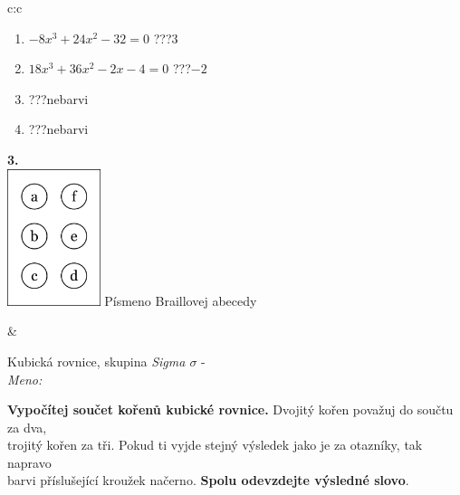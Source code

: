\documentclass[10pt]{report}
\begin{document}
\begin{tabular}{c:c}
\begin{minipage}[c][104.5mm][t]{0.5\linewidth}
\begin{center}
\begin{minipage}{0.79\linewidth}
\begin{center}
\begin{varwidth}{\linewidth}
\begin{enumerate}
\item $-8x^3+24x^2-32=0$\quad \dotfill\; ???\;\dotfill \quad $3$
\item $18x^3+36x^2-2x-4=0$\quad \dotfill\; ???\;\dotfill \quad $-2$
\item \quad \dotfill\; ???\;\dotfill \quad nebarvi
\item \quad \dotfill\; ???\;\dotfill \quad nebarvi
\end{enumerate}
\end{varwidth}
\end{center}
\end{minipage}
\begin{minipage}{0.20\linewidth}
\begin{center}
{\Huge\bfseries 3.} \\[2mm]
\includegraphics[height=40mm]{../images/braille.png}
{\small Písmeno Braillovej abecedy}
\end{center}
\end{minipage}
\end{center}
\end{minipage}
&
\begin{minipage}[c][104.5mm][t]{0.5\linewidth}
\begin{center}
\vspace{7mm}
{\huge Kubická rovnice, skupina \textit{Sigma $\sigma$} -}\\[5mm]
\textit{Meno:}\phantom{xxxxxxxxxxxxxxxxxxxxxxxxxxxxxxxxxxxxxxxxxxxxxxxxxxxxxxxxxxxxxxxxx}\\[5mm]
\begin{minipage}{0.95\linewidth}
\textbf{Vypočítej součet kořenů kubické rovnice.} Dvojitý kořen považuj do součtu za dva,\\trojitý kořen za tři. Pokud ti vyjde stejný výsledek jako je za otazníky, tak napravo\\barvi příslušející kroužek načerno. \textbf{Spolu odevzdejte výsledné slovo}.
\end{minipage}
\\[1mm]
\begin{minipage}{0.79\linewidth}
\begin{center}

\end{center}
\end{minipage}
\end{center}
\end{minipage}
\end{tabular}
\end{document}
